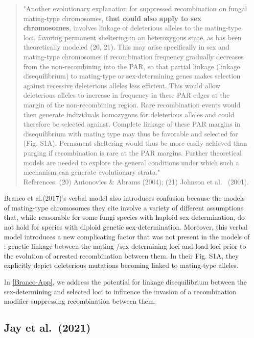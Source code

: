 \documentclass{article}
\begin{document}
\begin{appendices}
	\begin{quote}
		"Another evolutionary explanation for suppressed recombination on fungal mating-type chromosomes, {\bf that could also apply to sex chromosomes}, involves linkage of deleterious alleles to the mating-type loci, favoring permanent sheltering in an heterozygous state, as has been theoretically modeled (20, 21). This may arise specifically in sex and mating-type chromosomes if recombination frequency gradually decreases from the non-recombining into the PAR, so that partial linkage (linkage disequilibrium) to mating-type or sex-determining genes makes selection against recessive deleterious alleles less efficient. This would allow deleterious alleles to increase in frequency in these PAR edges at the margin of the non-recombining region. Rare recombination events would then generate individuals homozygous for deleterious alleles and could therefore be selected against. Complete linkage of these PAR margins in disequilibrium with mating type may thus be favorable and selected for (Fig. S1A). Permanent sheltering would thus be more easily achieved than purging if recombination is rare at the PAR margins. Further theoretical models are needed to explore the general conditions under which such a mechanism can generate evolutionary strata."\\
		\footnotesize{References: (20) Antonovics \& Abrams (2004); (21) Johnson et al.~ (2001).}
	\end{quote}

\noindent Branco et al.(2017)'s verbal model also introduces confusion because the models of mating-type chromosomes they cite involve a variety of different assumptions that, while reasonable for some fungi species with haploid sex-determination, do not hold for species with diploid genetic sex-determination. Moreover, this verbal model introduces a new complicating factor that was not present in the models of \citet{CharlesworthWall1999}: genetic linkage between the mating-/sex-determining loci and load loci prior to the evolution of arrested recombination between them. In their Fig. S1A, they explicitly depict deleterious mutations becoming linked to mating-type alleles.

In \ref{Branco-App}, we address the potential for linkage disequilibrium between the sex-determining and selected loci to influence the invasion of a recombination modifier suppressing recombination between them.


\subsection*{Jay et al.~(2021)}


\end{appendices}
\end{document}
